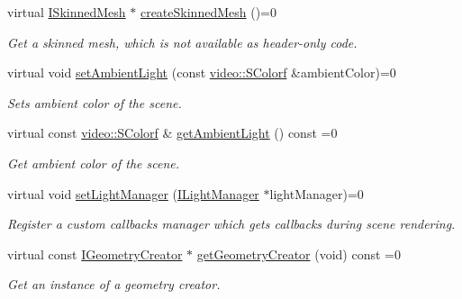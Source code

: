 \begin{DoxyCompactItemize}
virtual \hyperlink{classirr_1_1scene_1_1ISkinnedMesh}{I\+Skinned\+Mesh} $\ast$ \hyperlink{classirr_1_1scene_1_1ISceneManager_a67015b46ffde252ba723e6dcc6a93ac2}{create\+Skinned\+Mesh} ()=0
\begin{DoxyCompactList}\small\item\em Get a skinned mesh, which is not available as header-\/only code. \end{DoxyCompactList}\item 
\mbox{\label{classirr_1_1scene_1_1ISceneManager_a8a424accb615c4f60fde59f55033a816}} 
virtual void \hyperlink{classirr_1_1scene_1_1ISceneManager_a8a424accb615c4f60fde59f55033a816}{set\+Ambient\+Light} (const \hyperlink{classirr_1_1video_1_1SColorf}{video\+::\+S\+Colorf} \&ambient\+Color)=0
\begin{DoxyCompactList}\small\item\em Sets ambient color of the scene. \end{DoxyCompactList}\item 
\mbox{\label{classirr_1_1scene_1_1ISceneManager_a9da2090baaeeaa6261d6a1fac5025b09}} 
virtual const \hyperlink{classirr_1_1video_1_1SColorf}{video\+::\+S\+Colorf} \& \hyperlink{classirr_1_1scene_1_1ISceneManager_a9da2090baaeeaa6261d6a1fac5025b09}{get\+Ambient\+Light} () const =0
\begin{DoxyCompactList}\small\item\em Get ambient color of the scene. \end{DoxyCompactList}\item 
virtual void \hyperlink{classirr_1_1scene_1_1ISceneManager_a0065307bf3ff12fdc5b7bb624987a1c2}{set\+Light\+Manager} (\hyperlink{classirr_1_1scene_1_1ILightManager}{I\+Light\+Manager} $\ast$light\+Manager)=0
\begin{DoxyCompactList}\small\item\em Register a custom callbacks manager which gets callbacks during scene rendering. \end{DoxyCompactList}\item 
virtual const \hyperlink{classirr_1_1scene_1_1IGeometryCreator}{I\+Geometry\+Creator} $\ast$ \hyperlink{classirr_1_1scene_1_1ISceneManager_a9840cfd39b44f238d06b7bc51e6ba1f6}{get\+Geometry\+Creator} (void) const =0
\begin{DoxyCompactList}\small\item\em Get an instance of a geometry creator. \end{DoxyCompactList}\item 

\end{DoxyCompactItemize}
